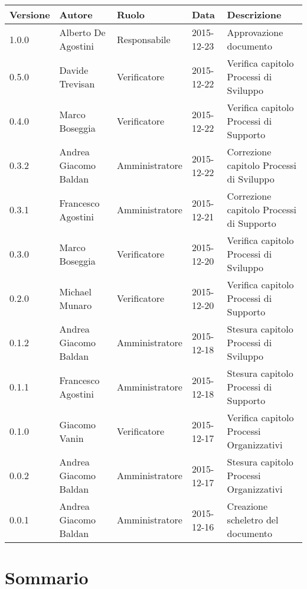\documentclass{scalatekids-article}
\begin{document}
\begin{center}
    \begin{tabular}{| l | l | l | l | l |}
        \hline
        Versione & Autore & Ruolo & Data & Descrizione \\
        \hline
        1.0.0 & Alberto De Agostini & Responsabile & 2015-12-23 & Approvazione documento\\
        \hline
        0.5.0 & Davide Trevisan & Verificatore & 2015-12-22 & Verifica capitolo Processi di Sviluppo\\
        \hline
        0.4.0 & Marco Boseggia & Verificatore & 2015-12-22 & Verifica capitolo Processi di Supporto\\
        \hline
        0.3.2 & Andrea Giacomo Baldan & Amministratore & 2015-12-22 & Correzione capitolo Processi di Sviluppo\\
        \hline
        0.3.1 & Francesco Agostini & Amministratore & 2015-12-21 & Correzione capitolo Processi di Supporto\\
        \hline
        0.3.0 & Marco Boseggia & Verificatore & 2015-12-20 & Verifica capitolo Processi di Sviluppo\\
        \hline
        0.2.0 & Michael Munaro & Verificatore & 2015-12-20 & Verifica capitolo Processi di Supporto\\
        \hline
        0.1.2 & Andrea Giacomo Baldan & Amministratore & 2015-12-18 & Stesura capitolo Processi di Sviluppo\\
        \hline
        0.1.1 & Francesco Agostini & Amministratore & 2015-12-18 & Stesura capitolo Processi di Supporto\\
        \hline
        0.1.0 & Giacomo Vanin & Verificatore & 2015-12-17 & Verifica capitolo Processi Organizzativi\\
        \hline
        0.0.2 & Andrea Giacomo Baldan & Amministratore & 2015-12-17 & Stesura capitolo Processi Organizzativi\\
        \hline
        0.0.1 & Andrea Giacomo Baldan & Amministratore & 2015-12-16 & Creazione scheletro del documento\\
        \hline
    \end{tabular}
\end{center}
\tableofcontents
\newpage
{}

\section{Sommario}
\end{document}
